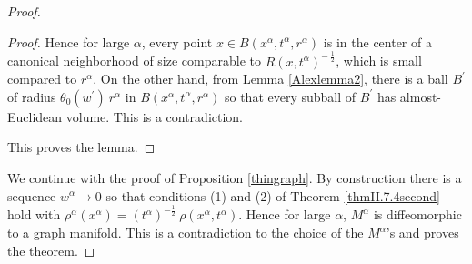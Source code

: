 \documentclass[12pt]{amsart}
\newcommand{\al}{\alpha}
\numberwithin{equation}{section}
\theoremstyle{plain}
\theoremstyle{definition}
\theoremstyle{remark}
\begin{document}
\begin{proof}
\begin{proof}
Hence for large $\al$, every point $x \in B \left( x^\al, t^\al,
r^\al \right)$ is in the
center of a canonical neighborhood of size comparable to
$R(x, t^\al)^{- \: \frac12}$, which is small compared to $r^\al$.
On the other hand,
from Lemma \ref{Alexlemma2}, 
there is a ball $B^\prime$ of radius $\theta_0(w^{\prime}) \:
r^\al$ in 
$B \left( x^\al, t^\al, r^\al \right)$ so that every subball of $B^\prime$ has 
almost-Euclidean volume. This is a contradiction.

This proves the lemma.
\end{proof}

We continue with the proof of Proposition \ref{thingraph}.
By construction there is a sequence $w^\al \rightarrow 0$ so that
conditions (1) and (2) of Theorem \ref{thmII.7.4second} hold
with $\rho^\al(x^\al) = (t^\al)^{- \frac12} \: \rho(x^\al, t^\al)$.
Hence for large $\al$, $M^\al$ is
diffeomorphic to a graph manifold.  This is a contradiction to the choice of
the $M^\al$'s and proves the theorem.


\end{proof}
\end{document}
